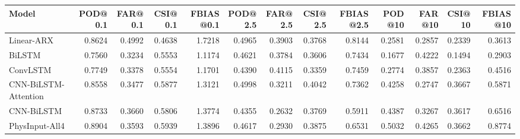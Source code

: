 \begin{tabular}{lrrrrrrrrrrrr}
\toprule
               Model &  POD@0.1 &  FAR@0.1 &  CSI@0.1 &  FBIAS@0.1 &  POD@2.5 &  FAR@2.5 &  CSI@2.5 &  FBIAS@2.5 &  POD@10 &  FAR@10 &  CSI@10 &  FBIAS@10 \\
\midrule
          Linear-ARX &   0.8624 &   0.4992 &   0.4638 &     1.7218 &   0.4965 &   0.3903 &   0.3768 &     0.8144 &  0.2581 &  0.2857 &  0.2339 &    0.3613 \\
              BiLSTM &   0.7560 &   0.3234 &   0.5553 &     1.1174 &   0.4621 &   0.3784 &   0.3606 &     0.7434 &  0.1677 &  0.4222 &  0.1494 &    0.2903 \\
            ConvLSTM &   0.7749 &   0.3378 &   0.5554 &     1.1701 &   0.4390 &   0.4115 &   0.3359 &     0.7459 &  0.2774 &  0.3857 &  0.2363 &    0.4516 \\
CNN-BiLSTM-Attention &   0.8558 &   0.3477 &   0.5877 &     1.3121 &   0.4998 &   0.3211 &   0.4042 &     0.7362 &  0.4258 &  0.2747 &  0.3667 &    0.5871 \\
          CNN-BiLSTM &   0.8733 &   0.3660 &   0.5806 &     1.3774 &   0.4355 &   0.2632 &   0.3769 &     0.5911 &  0.4387 &  0.3267 &  0.3617 &    0.6516 \\
      PhysInput-All4 &   0.8904 &   0.3593 &   0.5939 &     1.3896 &   0.4617 &   0.2930 &   0.3875 &     0.6531 &  0.5032 &  0.4265 &  0.3662 &    0.8774 \\
\bottomrule
\end{tabular}
